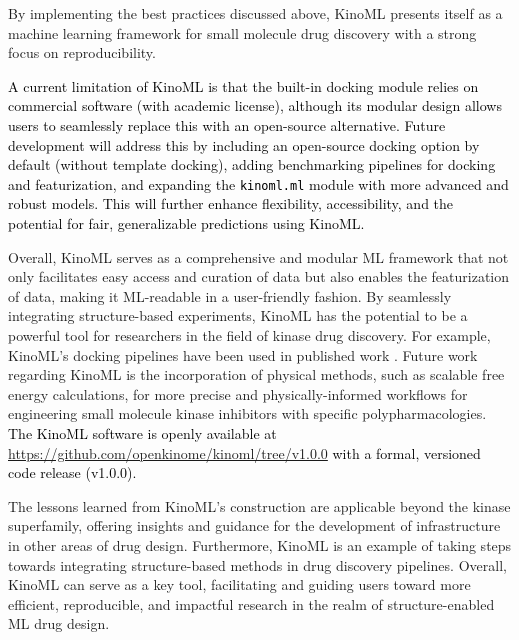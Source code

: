 \documentclass[9pt,lessons]{livecoms}
\newcommand{\revision}[1]{\textcolor{black}{#1}}
\begin{document}
By implementing the best practices discussed above, KinoML presents itself as a machine learning framework for small molecule drug discovery with a strong focus on reproducibility.  %

\revision{A current limitation of KinoML is that the built-in docking module relies on commercial software (with academic license), although its modular design allows users to seamlessly replace this with an open-source alternative. Future development will address this by including an open-source docking option by default (without template docking), adding benchmarking pipelines for docking and featurization, and expanding the \texttt{kinoml.ml} module with more advanced and robust models. This will further enhance flexibility, accessibility, and the potential for fair, generalizable predictions using KinoML.}

Overall, KinoML serves as a comprehensive and modular ML framework that not only facilitates easy access and curation of data but also enables the featurization of data, making it ML-readable in a user-friendly fashion. By seamlessly integrating structure-based experiments, KinoML has the potential to be a powerful tool for researchers in the field of kinase drug discovery. For example, KinoML's docking pipelines have been used in published work \cite{backenkohler2023guided, schaller2023benchmarking}.  Future work regarding KinoML is the incorporation of physical methods, such as scalable free energy calculations, for more precise and physically-informed workflows for engineering small molecule kinase inhibitors with specific polypharmacologies. \revision{The KinoML software is openly available at \url{https://github.com/openkinome/kinoml/tree/v1.0.0} with a formal, versioned code release (v1.0.0).}%

The lessons learned from KinoML's construction are applicable beyond the kinase superfamily, offering insights and guidance for the development of infrastructure in other areas of drug design. Furthermore, Kino\-ML is an example of taking steps towards integrating structure-based methods in drug discovery pipelines. Overall, KinoML can serve as a key tool, facilitating and guiding users toward more efficient, reproducible, and impactful research in the realm of structure-enabled ML drug design.
\end{document}
